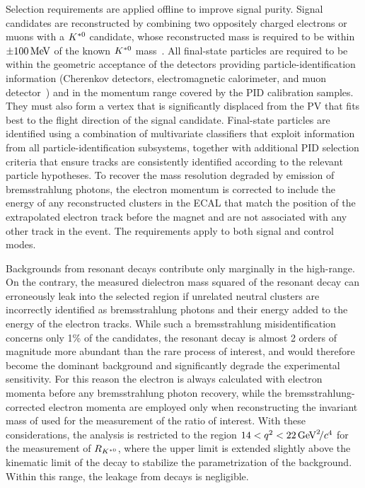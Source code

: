 Selection requirements are applied offline to improve signal purity. Signal candidates are reconstructed by combining two oppositely charged
electrons or muons with a ${{K}^{*0}}$ candidate, whose
reconstructed mass is required to be within $\pm100\text{\,Me\kern -0.1em V}$ of the known ${{K}^{*0}}$ mass~\cite{PDG2024}. All final-state particles are required to be within
the geometric acceptance of the detectors providing particle-identification information (Cherenkov detectors, electromagnetic calorimeter, and muon detector~\cite{LHCb-DP-2014-002}) and in
the momentum range covered by the PID calibration samples. They must also form a vertex that is significantly displaced from the PV  that fits best to the flight direction of the signal \B candidate. Final-state particles are identified using a combination of multivariate classifiers that exploit information from all particle-identification subsystems, together with additional PID selection criteria that ensure tracks are consistently identified according to the relevant particle hypotheses.
To recover the \Bz mass resolution degraded by emission of bremsstrahlung photons, the electron momentum is corrected to include the energy of any reconstructed
clusters in the ECAL that match the position of the extrapolated electron track before the magnet and are not associated with any other track in the event. The
requirements apply to both signal and control modes.

Backgrounds from resonant  decays contribute only marginally in the high-\qsq range.
On the contrary, the measured dielectron mass squared of the resonant decay  can erroneously leak into the selected region if unrelated neutral clusters are incorrectly identified as bremsstrahlung photons
and their energy added to the energy of the electron tracks.
While such a bremsstrahlung misidentification concerns only 1\% of the candidates, the resonant decay is almost 2 orders of magnitude more abundant than the rare process of interest, and would therefore become the dominant background and significantly degrade the experimental sensitivity. For this reason the electron \qsq is always calculated with electron momenta before any
bremsstrahlung photon recovery, while the bremsstrahlung-corrected electron momenta are employed only when reconstructing the invariant mass of \Bz used for the
measurement of the ratio of interest. With these considerations, the analysis is restricted to the region $14 < {q^2} < 22\text{\,Ge\kern -0.1em V}^2\!/c^4$ for
the measurement of $R_{{{K}^{*0}}}$, where the upper limit is extended slightly above the kinematic limit of the decay to stabilize the parametrization of the
background. Within this range, the leakage from  decays is negligible.

